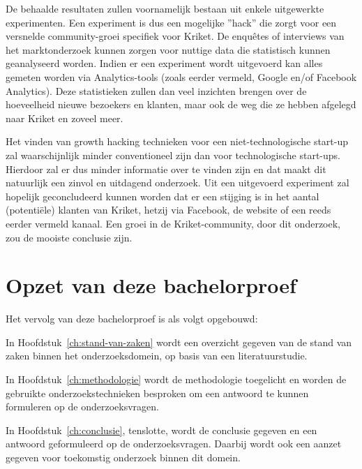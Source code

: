 De behaalde resultaten zullen voornamelijk bestaan uit enkele uitgewerkte experimenten. Een experiment is dus een mogelijke ”hack” die zorgt voor een versnelde community-groei specifiek voor Kriket. De enquêtes of interviews van het marktonderzoek kunnen zorgen voor nuttige data die statistisch kunnen geanalyseerd worden. Indien er een experiment wordt uitgevoerd kan alles gemeten worden via Analytics-tools (zoals eerder vermeld, Google en/of Facebook Analytics). Deze statistieken zullen dan veel inzichten brengen over de hoeveelheid nieuwe bezoekers en klanten, maar ook de weg die ze hebben afgelegd naar Kriket en zoveel meer.

Het vinden van growth hacking technieken voor een niet-technologische start-up zal waarschijnlijk minder conventioneel zijn dan voor technologische start-ups. Hierdoor zal er dus minder informatie over te vinden zijn en dat maakt dit natuurlijk een zinvol en uitdagend onderzoek.
Uit een uitgevoerd experiment zal hopelijk geconcludeerd kunnen worden dat er een stijging is in het aantal (potentiële) klanten van Kriket, hetzij via Facebook, de website of een reeds eerder vermeld kanaal. Een groei in de Kriket-community, door dit onderzoek, zou de mooiste conclusie zijn.

\section{Opzet van deze bachelorproef}
\label{sec:opzet-bachelorproef}


Het vervolg van deze bachelorproef is als volgt opgebouwd:

In Hoofdstuk~\ref{ch:stand-van-zaken} wordt een overzicht gegeven van de stand van zaken binnen het onderzoeksdomein, op basis van een literatuurstudie.

In Hoofdstuk~\ref{ch:methodologie} wordt de methodologie toegelicht en worden de gebruikte onderzoekstechnieken besproken om een antwoord te kunnen formuleren op de onderzoeksvragen.


In Hoofdstuk~\ref{ch:conclusie}, tenslotte, wordt de conclusie gegeven en een antwoord geformuleerd op de onderzoeksvragen. Daarbij wordt ook een aanzet gegeven voor toekomstig onderzoek binnen dit domein.

